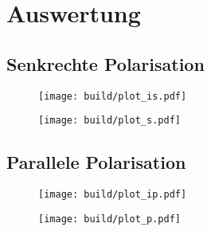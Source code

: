 \section{Auswertung}
\label{sec:auswertung}

\subsection{Senkrechte Polarisation}

\begin{figure}[H]
	\texttt{[image: build/plot\_is.pdf]}
	\caption{}
	\label{fig:plot_is}
\end{figure}

\begin{figure}[H]
	\texttt{[image: build/plot\_s.pdf]}
	\caption{}
	\label{fig:plot_s}
\end{figure}

\subsection{Parallele Polarisation}

\begin{figure}[H]
	\texttt{[image: build/plot\_ip.pdf]}
	\caption{}
	\label{fig:plot_ip}
\end{figure}

\begin{figure}[H]
	\texttt{[image: build/plot\_p.pdf]}
	\caption{}
	\label{fig:plot_p}
\end{figure}
